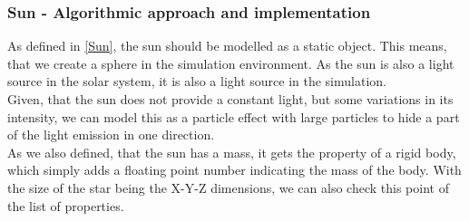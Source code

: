 \documentclass[conference,compsoc]{IEEEtran}
\begin{document}
\subsubsection{Sun - Algorithmic approach and implementation}
As defined in \ref{Sun}, the sun should be modelled as a static object. This means, that we create a sphere in the simulation environment. As the sun is also a light source in the solar system, it is also a light source in the simulation. \\
Given, that the sun does not provide a constant light, but some variations in its intensity, we can model this as a particle effect with large particles to hide a part of the light emission in one direction. \\
As we also defined, that the sun has a mass, it gets the property of a rigid body, which simply adds a floating point number indicating the mass of the body. With the size of the star being the X-Y-Z dimensions, we can also check this point of the list of properties.
\end{document}
